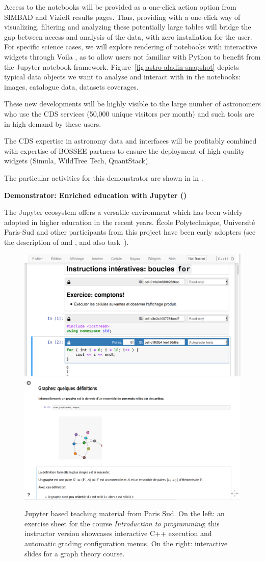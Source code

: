   Access to the notebooks will be provided as a one-click action option from
  SIMBAD and VizieR results pages.
  Thus, providing with a one-click way of visualizing, filtering and analyzing
these potentially large tables will bridge the gap between access and analysis
of the data, with zero installation for the user.
  For specific science cases, we will explore rendering of notebooks with
  interactive widgets through Voila \cite{Voila}, as to allow users not familiar with
  Python to benefit from the Jupyter notebook framework.
  Figure~\ref{fig:astro-aladin-snapshot} depicts typical data objects we want to analyse and interact with in the notebooks: images, catalogue data, datasets coverages.

  These new developments will be highly visible to the large number of astronomers who use the CDS services (50,000 unique visitors per month) and such tools are in high demand by these users.

  The CDS expertise in astronomy data and interfaces will be profitably combined with expertise of BOSSEE partners to ensure the deployment of high quality widgets (Simula, WildTree Tech, QuantStack).

  The particular activities for this demonstrator are shown in
   in .

\medskip
\noindent\textbf{Demonstrator: Enriched education with Jupyter ()}\label{sec:concept-demonstrator-teaching}

  The Jupyter
  ecosystem offers a versatile environment which has been widely
  adopted in higher education in the recent years. École
  Polytechnique, Université Paris-Sud and other participants from this
  project have been early adopters (see the description of 
  and , and also task~).

  \begin{figure}[ht!]\centering
  \includegraphics[width=.45\textwidth]{images/teaching-cling}\quad
  \includegraphics[width=.45\textwidth]{images/teaching-graphs}
  \caption{Jupyter based teaching material from Paris Sud. On the
    left: an exercise sheet for the course \emph{Introduction to
      programming}; this instructor version showcases interactive C++
    execution and automatic grading configuration menus. On the right:
    interactive slides for a graph theory course.}\label{fig:teaching-cling}
  \end{figure}

